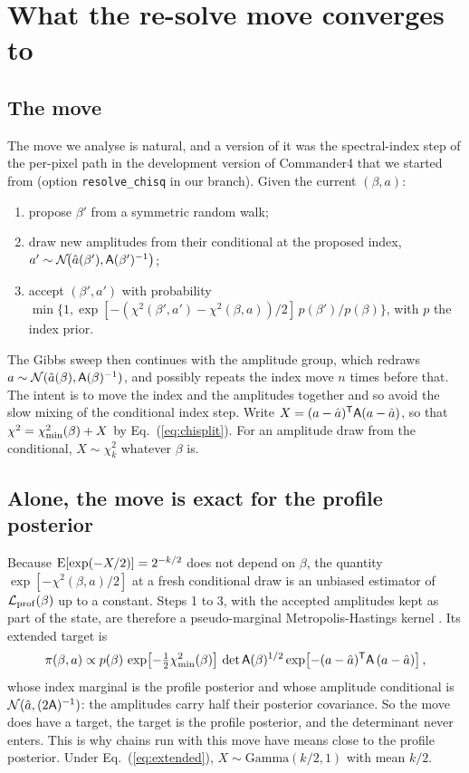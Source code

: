 \section{What the re-solve move converges to}
\label{sec:legacy}

\subsection{The move}

The move we analyse is natural, and a version of it was the spectral-index step of the per-pixel
path in the development version of Commander4 that we started from (option
\texttt{resolve\_chisq} in our branch). Given the current $(\beta, a)$:
\begin{enumerate}
  \item propose $\beta'$ from a symmetric random walk;
  \item draw new amplitudes from their conditional at the proposed index,
        $a' \sim \mathcal{N}\!\big(\hat a(\beta'), \mathsf{A}(\beta')^{-1}\big)$;
  \item accept $(\beta', a')$ with probability $\min\{1, \exp[-(\chi^2(\beta',a') - \chi^2(\beta,a))/2]\,
        p(\beta')/p(\beta)\}$, with $p$ the index prior.
\end{enumerate}
The Gibbs sweep then continues with the amplitude group, which redraws
$a \sim \mathcal{N}(\hat a(\beta), \mathsf{A}(\beta)^{-1})$, and possibly repeats the index move $n$ times before
that. The intent is to move the index and the amplitudes together and so avoid the slow mixing of the
conditional index step. Write $X = (a-\hat a)^{\mathsf{T}} \mathsf{A} (a-\hat a)$, so that
$\chi^2 = \chi^2_{\min}(\beta) + X$ by Eq.~(\ref{eq:chisplit}). For an amplitude draw from the conditional,
$X \sim \chi^2_k$ whatever $\beta$ is.

\subsection{Alone, the move is exact for the profile posterior}

Because $\mathrm{E}[\exp(-X/2)] = 2^{-k/2}$ does not depend on $\beta$, the quantity
$\exp[-\chi^2(\beta, a)/2]$ at a fresh conditional draw is an unbiased estimator of
$\mathcal{L}_{\rm prof}(\beta)$ up to a constant. Steps 1 to 3, with the accepted amplitudes kept as
part of the state, are therefore a pseudo-marginal Metropolis-Hastings kernel
\citep{beaumont2003,andrieu2009}. Its extended target is
\begin{equation}
  \pi(\beta, a) \propto p(\beta)\, \exp\!\left[-\tfrac12\chi^2_{\min}(\beta)\right]\,
  \det\mathsf{A}(\beta)^{1/2} \exp\!\left[-(a-\hat a)^{\mathsf{T}} \mathsf{A}\, (a-\hat a)\right],
  \label{eq:extended}
\end{equation}
whose index marginal is the profile posterior and whose amplitude conditional is
$\mathcal{N}(\hat a, (2\mathsf{A})^{-1})$: the amplitudes carry half their posterior covariance. So the move
does have a target, the target is the profile posterior, and the determinant never enters. This is why
chains run with this move have means close to the profile posterior. Under
Eq.~(\ref{eq:extended}), $X \sim \mathrm{Gamma}(k/2, 1)$ with mean $k/2$.

